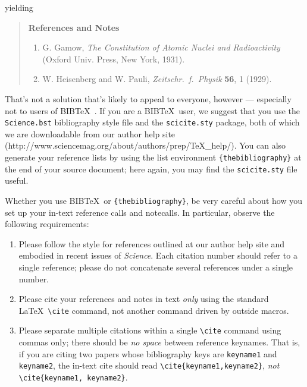\documentclass[12pt]{article}
\begin{document}
\noindent yielding

\begin{quote}
{\bf References and Notes}

\begin{enumerate}
\item G. Gamow, {\it The Constitution of Atomic Nuclei and
Radioactivity\/} (Oxford Univ. Press, New York, 1931).
\item W. Heisenberg and W. Pauli, {\it Zeitschr.\ f.\ Physik} {\bf 56},
1 (1929).
\end{enumerate}
\end{quote}

That's not a solution that's likely to appeal to everyone, however ---
especially not to users of B{\small{IB}}\TeX\ \cite{inclme}.  If you
are a B{\small{IB}}\TeX\ user, we suggest that you use the
\texttt{Science.bst} bibliography style file and the
\texttt{scicite.sty} package, both of which we are downloadable from our author help site
(http://www.sciencemag.org/about/authors/prep/TeX\_help/).  You can also
generate your reference lists by using the list environment
\texttt{\{thebibliography\}} at the end of your source document; here
again, you may find the \texttt{scicite.sty} file useful.

Whether you use B{\small{IB}}\TeX\ or \texttt{\{thebibliography\}}, be
very careful about how you set up your in-text reference calls and
notecalls.  In particular, observe the following requirements:

\begin{enumerate}
\item Please follow the style for references outlined at our author
  help site and embodied in recent issues of {\it Science}.  Each
  citation number should refer to a single reference; please do not
  concatenate several references under a single number.
\item Please cite your references and notes in text {\it only\/} using
  the standard \LaTeX\ \verb+\cite+ command, not another command
  driven by outside macros.
\item Please separate multiple citations within a single \verb+\cite+
  command using commas only; there should be {\it no space\/}
  between reference keynames.  That is, if you are citing two
  papers whose bibliography keys are \texttt{keyname1} and
  \texttt{keyname2}, the in-text cite should read
  \verb+\cite{keyname1,keyname2}+, {\it not\/}
  \verb+\cite{keyname1, keyname2}+.
\end{enumerate}
\end{document}
